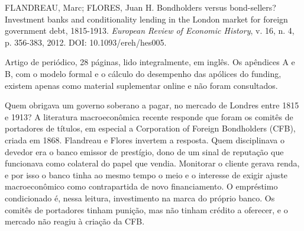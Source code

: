 
\begin{identificacao}
FLANDREAU, Marc; FLORES, Juan H. Bondholders versus bond-sellers? Investment
banks and conditionality lending in the London market for foreign government
debt, 1815-1913. \emph{European Review of Economic History}, v. 16, n. 4,
p. 356-383, 2012. DOI: 10.1093/ereh/hes005.

Artigo de periódico, 28 páginas, lido integralmente, em inglês. Os apêndices A
e B, com o modelo formal e o cálculo do desempenho das apólices do funding,
existem apenas como material suplementar online e não foram consultados.
\end{identificacao}

Quem obrigava um governo soberano a pagar, no mercado de Londres entre 1815 e
1913? A literatura macroeconômica recente responde que foram os comitês de
portadores de títulos, em especial a Corporation of Foreign Bondholders (CFB),
criada em 1868. Flandreau e Flores invertem a resposta. Quem disciplinava o
devedor era o banco emissor de prestígio, dono de um sinal de reputação que
funcionava como colateral do papel que vendia. Monitorar o cliente gerava renda,
e por isso o banco tinha ao mesmo tempo o meio e o interesse de exigir ajuste
macroeconômico como contrapartida de novo financiamento. O empréstimo
condicionado é, nessa leitura, investimento na marca do próprio banco. Os
comitês de portadores tinham punição, mas não tinham crédito a oferecer, e o
mercado não reagiu à criação da CFB.


